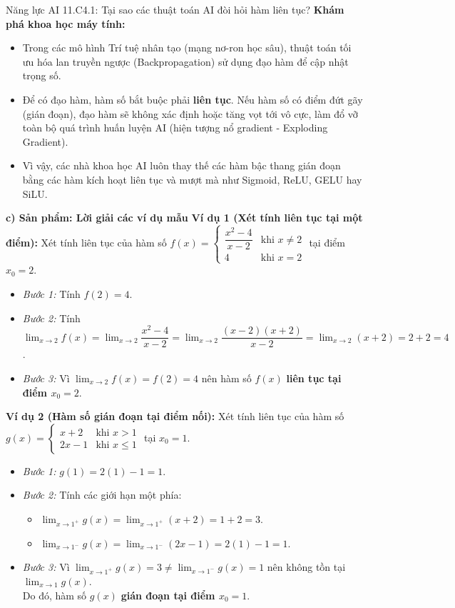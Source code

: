 \documentclass[12pt, a4paper]{article}
\begin{document}
\begin{aibox}{Năng lực AI 11.C4.1: Tại sao các thuật toán AI đòi hỏi hàm liên tục?}
\textbf{Khám phá khoa học máy tính:}
\begin{itemize}[leftmargin=0.6cm]
    \item Trong các mô hình Trí tuệ nhân tạo (mạng nơ-ron học sâu), thuật toán tối ưu hóa lan truyền ngược (Backpropagation) sử dụng đạo hàm để cập nhật trọng số.
    \item Để có đạo hàm, hàm số bắt buộc phải \textbf{liên tục}. Nếu hàm số có điểm đứt gãy (gián đoạn), đạo hàm sẽ không xác định hoặc tăng vọt tới vô cực, làm đổ vỡ toàn bộ quá trình huấn luyện AI (hiện tượng nổ gradient - Exploding Gradient).
    \item Vì vậy, các nhà khoa học AI luôn thay thế các hàm bậc thang gián đoạn bằng các hàm kích hoạt liên tục và mượt mà như Sigmoid, ReLU, GELU hay SiLU.
\end{itemize}
\end{aibox}

\noindent \textbf{c) Sản phẩm: Lời giải các ví dụ mẫu}
\textbf{Ví dụ 1 (Xét tính liên tục tại một điểm):} Xét tính liên tục của hàm số $f(x) = \begin{cases} \dfrac{x^2 - 4}{x - 2} & \text{khi } x \neq 2 \\ 4 & \text{khi } x = 2 \end{cases}$ tại điểm $x_0 = 2$.
\begin{itemize}[leftmargin=0.6cm]
    \item \textit{Bước 1:} Tính $f(2) = 4$.
    \item \textit{Bước 2:} Tính $\lim_{x \to 2} f(x) = \lim_{x \to 2} \dfrac{x^2 - 4}{x - 2} = \lim_{x \to 2} \dfrac{(x-2)(x+2)}{x-2} = \lim_{x \to 2} (x + 2) = 2 + 2 = 4$.
    \item \textit{Bước 3:} Vì $\lim_{x \to 2} f(x) = f(2) = 4$ nên hàm số $f(x)$ \textbf{liên tục tại điểm $x_0 = 2$}.
\end{itemize}

\textbf{Ví dụ 2 (Hàm số gián đoạn tại điểm nối):} Xét tính liên tục của hàm số $g(x) = \begin{cases} x + 2 & \text{khi } x > 1 \\ 2x - 1 & \text{khi } x \le 1 \end{cases}$ tại $x_0 = 1$.
\begin{itemize}[leftmargin=0.6cm]
    \item \textit{Bước 1:} $g(1) = 2(1) - 1 = 1$.
    \item \textit{Bước 2:} Tính các giới hạn một phía:
    \begin{itemize}
        \item $\lim_{x \to 1^+} g(x) = \lim_{x \to 1^+} (x + 2) = 1 + 2 = 3$.
        \item $\lim_{x \to 1^-} g(x) = \lim_{x \to 1^-} (2x - 1) = 2(1) - 1 = 1$.
    \end{itemize}
    \item \textit{Bước 3:} Vì $\lim_{x \to 1^+} g(x) = 3 \neq \lim_{x \to 1^-} g(x) = 1$ nên không tồn tại $\lim_{x \to 1} g(x)$.\\
    Do đó, hàm số $g(x)$ \textbf{gián đoạn tại điểm $x_0 = 1$}.
\end{itemize}
\end{document}
